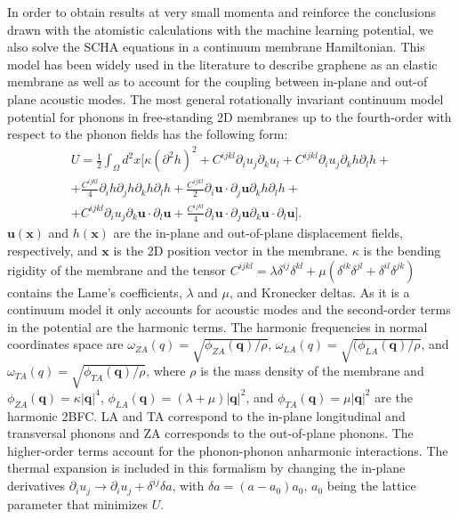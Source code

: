 In order to obtain results at very small momenta and reinforce the conclusions drawn with the atomistic calculations 
with the machine learning potential, we also solve the SCHA equations in a continuum membrane Hamiltonian. This model 
has been widely used in the literature to describe graphene as an elastic membrane as well as to account for the 
coupling between in-plane and out-of plane acoustic 
modes\cite{mariani2008flexural,amorim2014thermodynamics,de2012bending}. The most general rotationally invariant 
continuum model potential for phonons in free-standing 2D membranes up to the fourth-order with respect to the 
phonon fields has the following form:
\begin{multline}
 \label{membrane-potential}
 U=\frac{1}{2}\int_{\Omega}d^{2}x[\kappa(\partial^{2}h)^{2}+C^{ijkl}\partial_{i}u_{j}\partial_{k}u_{l}+C^{ijkl}\partial_{i}u_{j}\partial_{k}h\partial_{l}h+\\ +\frac{C^{ijkl}}{4}\partial_{i}h\partial_{j}h\partial_{
 k}h\partial_{l}h+\frac{C^{ijkl}}{2}\partial_{i}\boldsymbol{u}\cdot\partial_{j}\boldsymbol{u}\partial_{k}h\partial_{l}h+\\+C^{ijkl}\partial_{i}u_{j}\partial_{k}\boldsymbol{u}\cdot\partial_{l}\boldsymbol{u}+
 \frac{C^{ijkl}}{4}\partial_{i}\boldsymbol{u}\cdot\partial_{j}\boldsymbol{u}\partial_{k}\boldsymbol{u}\cdot\partial_{l}\boldsymbol{u}].
\end{multline}
$\boldsymbol{u}(\boldsymbol{x})$ and $h(\boldsymbol{x})$ are the in-plane and out-of-plane displacement 
fields, respectively, and $\boldsymbol{x}$ is the 2D position vector in the membrane. $\kappa$ is the bending 
rigidity of the membrane and the tensor 
$C^{ijkl}=\lambda\delta^{ij}\delta^{kl}+\mu(\delta^{ik}\delta^{jl}+\delta^{il}\delta^{jk})$ contains the Lame's 
coefficients, $\lambda$ and $\mu$, and Kronecker deltas. As it is a continuum model it only accounts for acoustic 
modes and the second-order terms in the potential are the harmonic terms. The harmonic frequencies in normal 
coordinates space are $\omega_{ZA}(q)=\sqrt{\phi_{ZA}(\boldsymbol{q})/\rho}$, 
$\omega_{LA}(q)=\sqrt{(\phi_{LA}(\boldsymbol{q})/\rho}$, and 
$\omega_{TA}(q)=\sqrt{\phi_{TA}(\boldsymbol{q})/\rho}$, where $\rho$ is the mass density of the membrane and 
$\phi_{ZA}(\boldsymbol{q})=\kappa |\boldsymbol{q}|^{4}$, 
$\phi_{LA}(\boldsymbol{q})=(\lambda+\mu)|\boldsymbol{q}|^{2}$, and
$\phi_{TA}(\boldsymbol{q})=\mu|\boldsymbol{q}|^{2}$ are the harmonic 2BFC. LA and TA correspond to the in-plane 
longitudinal and transversal phonons and ZA corresponds to the out-of-plane phonons. The higher-order terms account 
for the phonon-phonon anharmonic interactions. The thermal expansion is included in this formalism by changing the 
in-plane derivatives $\partial_{i}u_{j}\rightarrow \partial_{i}u_{j}+\delta^{ij}\delta a$, with 
$\delta a=(a-a_{0})a_{0}$, $a_{0}$ being the lattice parameter that minimizes $U$. \\

